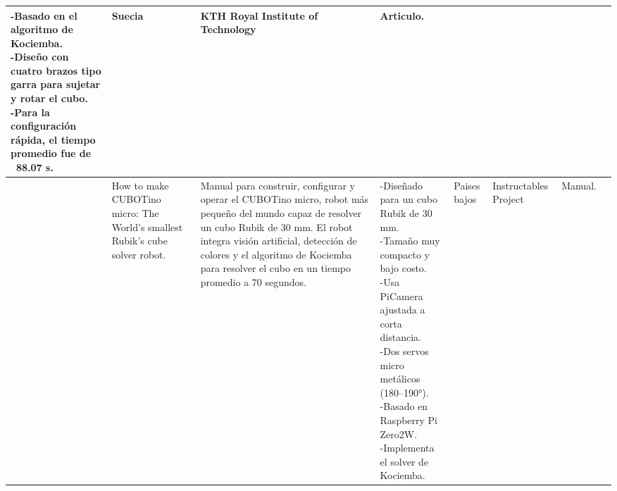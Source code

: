 \begin{sidewaystable}
\begin{tabular}{m{5mm} m{25mm} m{45mm} m{40mm} m{15mm} m{18mm} m{12mm} m{14mm}}
{    -Basado en el algoritmo de Kociemba.\\
    -Diseño con cuatro brazos tipo garra para sujetar y rotar el cubo.\\
    -Para la configuración rápida, el tiempo promedio fue de ~88.07 s.\\
     }
 & 
    \centering Suecia & \centering KTH Royal Institute of Technology
 & \centering Articulo. &  \\
    \midrule
    \centering 3 & \centering How to make CUBOTino micro: The World’s smallest Rubik’s cube solver robot. & \parbox{45mm}{ Manual para construir, configurar y operar el CUBOTino micro, robot más pequeño del mundo capaz de resolver un cubo Rubik de 30 mm.  El robot integra visión artificial, detección de colores y el algoritmo de Kociemba para resolver el cubo en un tiempo promedio a 70 segundos.} & 
    \parbox{40mm}{
    -Diseñado para un cubo Rubik de 30 mm.\\
    -Tamaño muy compacto y bajo costo.\\
    -Usa PiCamera ajustada a corta distancia.\\
    -Dos servos micro metálicos (180--190°).\\
    -Basado en Raspberry Pi Zero2W.\\
    -Implementa el solver de Kociemba.\\
    } & 
    \centering Paises bajos & \centering Instructables Project & \centering Manual. &  \\
    \bottomrule
  \end{tabular}  
\end{sidewaystable}

\FloatBarrier

